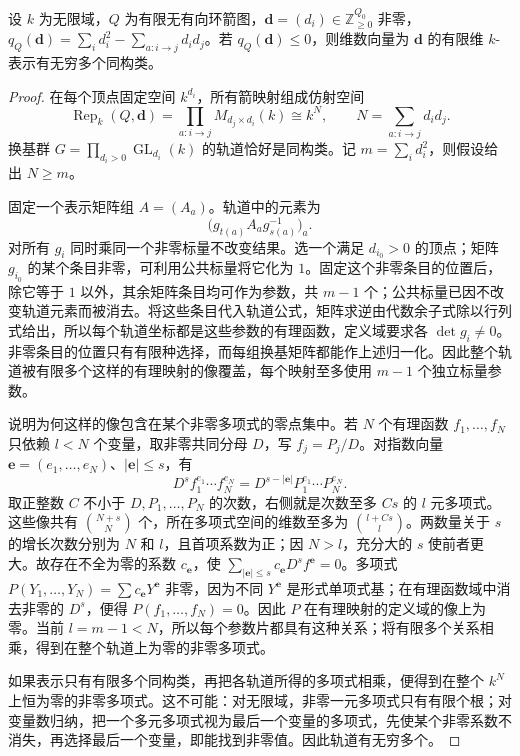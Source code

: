 \begin{lemma}\label{b5:lem:quiver-parameter-count}
	设 \(k\) 为无限域，\(Q\) 为有限无有向环箭图，\(\mathbf d=(d_i)\in\mathbb Z_{\geq0}^{Q_0}\) 非零，\(q_Q(\mathbf d)=\sum_i d_i^2-\sum_{a:i\to j}d_id_j\)。若 \(q_Q(\mathbf d)\leq0\)，则维数向量为 \(\mathbf d\) 的有限维 \(k\)-表示有无穷多个同构类。
\end{lemma}
\begin{proof}
	在每个顶点固定空间 \(k^{d_i}\)，所有箭映射组成仿射空间
	\[
		\operatorname{Rep}_k(Q,\mathbf d) =\prod_{a:i\to j}M_{d_j\times d_i}(k)\cong k^N,\qquad N=\sum_{a:i\to j}d_i d_j.
	\]
	换基群 \(G=\prod_{d_i>0}\operatorname{GL}_{d_i}(k)\) 的轨道恰好是同构类。记 \(m=\sum_i d_i^2\)，则假设给出 \(N\geq m\)。

	固定一个表示矩阵组 \(A=(A_a)\)。轨道中的元素为
	\[
		\bigl(g_{t(a)}A_a g_{s(a)}^{-1}\bigr)_a.
	\]
	对所有 \(g_i\) 同时乘同一个非零标量不改变结果。选一个满足 \(d_{i_0}>0\) 的顶点；矩阵 \(g_{i_0}\) 的某个条目非零，可利用公共标量将它化为 \(1\)。固定这个非零条目的位置后，除它等于 \(1\) 以外，其余矩阵条目均可作为参数，共 \(m-1\) 个；公共标量已因不改变轨道元素而被消去。将这些条目代入轨道公式，矩阵求逆由代数余子式除以行列式给出，所以每个轨道坐标都是这些参数的有理函数，定义域要求各 \(\det g_i\ne0\)。非零条目的位置只有有限种选择，而每组换基矩阵都能作上述归一化。因此整个轨道被有限多个这样的有理映射的像覆盖，每个映射至多使用 \(m-1\) 个独立标量参数。

	说明为何这样的像包含在某个非零多项式的零点集中。若 \(N\) 个有理函数 \(f_1,\ldots,f_N\) 只依赖 \(l<N\) 个变量，取非零共同分母 \(D\)，写 \(f_j=P_j/D\)。对指数向量 \(\mathbf e=(e_1,\ldots,e_N)\)、\(|\mathbf e|\le s\)，有
	\[
		D^s f_1^{e_1}\cdots f_N^{e_N} =D^{s-|\mathbf e|}P_1^{e_1}\cdots P_N^{e_N}.
	\]
	取正整数 \(C\) 不小于 \(D,P_1,\ldots,P_N\) 的次数，右侧就是次数至多 \(Cs\) 的 \(l\) 元多项式。这些像共有 \(\binom{N+s}{N}\) 个，所在多项式空间的维数至多为 \(\binom{l+Cs}{l}\)。两数量关于 \(s\) 的增长次数分别为 \(N\) 和 \(l\)，且首项系数为正；因 \(N>l\)，充分大的 \(s\) 使前者更大。故存在不全为零的系数 \(c_{\mathbf e}\)，使 \(\sum_{|\mathbf e|\le s}c_{\mathbf e}D^sf^{\mathbf e}=0\)。多项式 \(P(Y_1,\ldots,Y_N)=\sum c_{\mathbf e}Y^{\mathbf e}\) 非零，因为不同 \(Y^{\mathbf e}\) 是形式单项式基；在有理函数域中消去非零的 \(D^s\)，便得 \(P(f_1,\ldots,f_N)=0\)。因此 \(P\) 在有理映射的定义域的像上为零。当前 \(l=m-1<N\)，所以每个参数片都具有这种关系；将有限多个关系相乘，得到在整个轨道上为零的非零多项式。

	如果表示只有有限多个同构类，再把各轨道所得的多项式相乘，便得到在整个 \(k^N\) 上恒为零的非零多项式。这不可能：对无限域，非零一元多项式只有有限个根；对变量数归纳，把一个多元多项式视为最后一个变量的多项式，先使某个非零系数不消失，再选择最后一个变量，即能找到非零值。因此轨道有无穷多个。
\end{proof}

